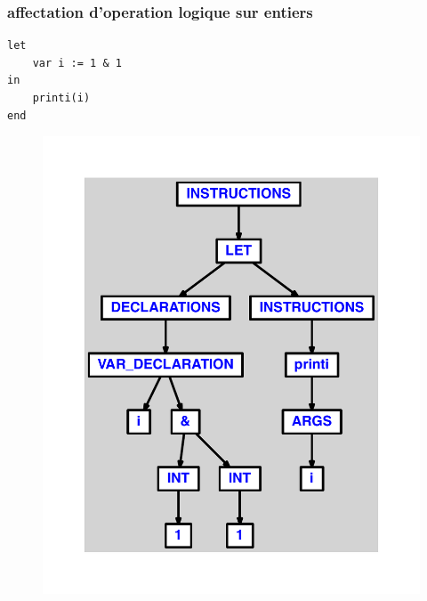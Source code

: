 \documentclass{article}
\begin{document}
\subsubsection{affectation d'operation logique sur entiers}
\begin{lstlisting}
let
	var i := 1 & 1
in
	printi(i)
end
\end{lstlisting}
\newpage
\begin{figure}[H]
\centering
\includegraphics[max width=\textwidth]{ast/ast_299.pdf}
\end{figure}
\newpage
\end{document}
